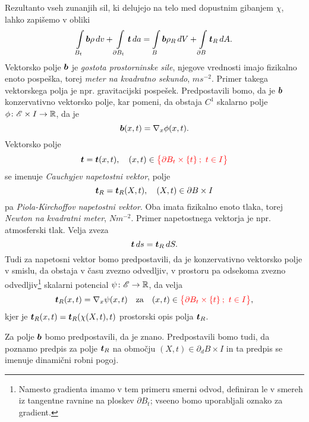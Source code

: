 Rezultanto vseh zunanjih sil, ki delujejo na telo med dopustnim gibanjem $\chi$, lahko zapišemo v obliki
\begin{equation}\label{e:zunsil}
	\int\limits_{B_t}\boldsymbol b\rho\, dv + \int\limits_{\partial B_t}\boldsymbol t\, da =
	\int\limits_{B}\boldsymbol b\rho_R\, dV + \int\limits_{\partial B}\boldsymbol t_R\, dA.
\end{equation}
Vektorsko polje $\boldsymbol b$ je \emph{gostota prostorninske sile}, njegove vrednosti imajo fizikalno enoto
pospeška, torej \textit{meter na kvadratno sekundo}, $ms^{-2}$. Primer takega vektorskega polja
je npr. gravitacijski pospešek. Predpostavili bomo, da je $\boldsymbol b$ konzervativno vektorsko polje,
kar pomeni, da obstaja $C^1$ skalarno polje $\phi\colon\mathscr E\times I\to\mathbb R$, da je
\begin{equation*} \label{e:gps}
	\boldsymbol b(x,t)=\nabla_{x}\phi(x,t).
\end{equation*}
Vektorsko polje
\begin{equation*} \label{e:csv}
	\vek{t}=\vek{t}(x,t),\quad (x,t)\in \textcolor[rgb]{1,0,0}{\big\{\partial B_t\times\{t\}\: ;\ t\in I\big\}}
\end{equation*}
se imenuje \emph{Cauchyjev napetostni vektor}, polje
\begin{equation*} \label{e:pksv}
	\boldsymbol t_R=\boldsymbol t_R(X,t),\quad (X,t)\in \partial B\times I
\end{equation*}
pa \emph{Piola-Kirchoffov napetostni vektor}. Oba
imata fizikalno enoto tlaka, torej \textit{Newton na kvadratni meter}, $Nm^{-2}$.
Primer napetostnega vektorja je npr. atmosferski tlak.
Velja zveza
\begin{equation}\label{e:ttr}
	\boldsymbol t\, ds=\boldsymbol t_R\, dS.
\end{equation}
Tudi za napetosni vektor bomo predpostavili, da je konzervativno vektorsko polje v smislu,
da obstaja v času zvezno odvedljiv, v prostoru pa odsekoma zvezno odvedljiv\footnote{Namesto gradienta imamo v tem primeru
smerni odvod, definiran le v smereh iz tangentne ravnine na ploskev $\partial B_t$; vseeno bomo uporabljali oznako za gradient.}
skalarni potencial $\psi\colon\mathscr E\to\mathbb R$, da velja
\[ \vek{t}_R(x,t)=\nabla_{x}\psi(x,t)\quad\textrm{za}\quad (x,t)\in \textcolor[rgb]{1,0,0}{\big\{\partial B_t\times\{t\}\: ;\ t\in I\big\}}, \]
kjer je $\boldsymbol t_R(x,t)=\boldsymbol t_R(\chi(X,t),t)$ prostorski opis polja $\boldsymbol t_R$.

Za polje $\boldsymbol b$ bomo predpostavili, da je znano. Predpostavili bomo tudi, da poznamo predpis za
polje $\boldsymbol t_R$ na območju $(X,t)\in \partial_d B\times I$ in ta predpis
se imenuje dinamični robni pogoj.

